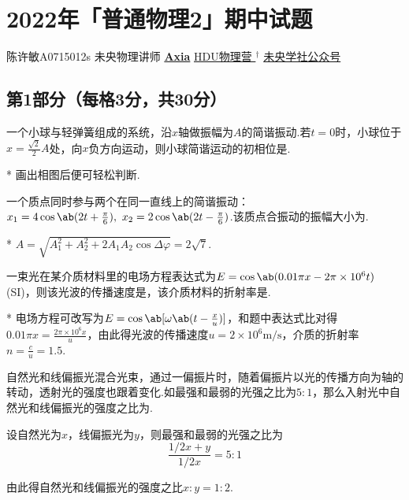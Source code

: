 \chapter{2022年「普通物理2」期中试题}
\date{2022年10月25日}{陈许敏}{A0715012s}
{未央物理讲师 \href{https://qm.qq.com/q/UPbGudx8cK}{\textbf{Axia}}}
{}{\href{https://h5.qun.qq.com/s/AQoh8mQn7O}{HDU物理营 \!$^{\dagger}$}}
{}{\href{http://weixin.qq.com/r/mhKYgFTEMQlOrRDj90eI}{未央学社公众号}}

\section*{第1部分（每格3分，共30分）}

\begin{problem}[简谐振动]
    一个小球与轻弹簧组成的系统，沿$x$轴做振幅为$A$的简谐振动.若$t=0$时，小球位于$x=\frac{\sqrt{2}}{2}A$处，向$x$负方向运动，则小球简谐运动的初相位是.
\end{problem}
\begin{solution}*
    画出相图后便可轻松判断.
\end{solution}

\begin{problem}[简谐振动的合成]
    一个质点同时参与两个在同一直线上的简谐振动：$x_1=4\cos{\ab(2t+\frac{\pi}{6})},\ x_2=2\cos{\ab(2t-\frac{\pi}{6})}$.该质点合振动的振幅大小为.
\end{problem}
\begin{solution}*
    $A=\sqrt{A_1^2+A_2^2+2A_1A_2\cos{\Delta\varphi}}=2\sqrt{7}$.
\end{solution}

\begin{problem}[平面简谐波的物理量]
    一束光在某介质材料里的电场方程表达式为$E=\cos{\ab(0.01\pi x-2\pi\times 10^6t)}$ (SI)，则该光波的传播速度是，该介质材料的折射率是.
\end{problem}
\begin{solution}*
电场方程可改写为$E=\cos{\ab[\omega\ab(t-\frac{x}{u})]}$，和题中表达式比对得$0.01\pi x=\frac{2\pi\times 10^6x}{u}$，由此得光波的传播速度$u=2\times 10^{6}\mathrm{m/s}$，介质的折射率$n=\frac{c}{u}=1.5$.
\end{solution}

\begin{problem}[光的偏振]
    自然光和线偏振光混合光束，通过一偏振片时，随着偏振片以光的传播方向为轴的转动，透射光的强度也跟着变化.如最强和最弱的光强之比为$5:1$，那么入射光中自然光和线偏振光的强度之比为.
\end{problem}
\begin{solution}
    设自然光为$x$，线偏振光为$y$，则最强和最弱的光强之比为
    \[\frac{1/2x+y}{1/2x}=5:1\]

    由此得自然光和线偏振光的强度之比$x:y=1:2$.
\end{solution}


